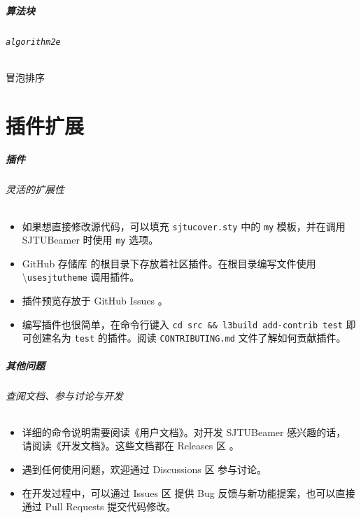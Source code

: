 \documentclass[
    aspectratio=169,  %
]{ctexbeamer}
\newcommand{\link}[1]{\href{#1}{\faLink}}
\begin{document}
\begin{frame}
  \frametitle{算法块}
  \framesubtitle{\texttt{algorithm2e}}

  \begin{algorithm}[H]
    \caption{冒泡排序}\label{alg:bubblesort}
    \BlankLine
    \;
  \end{algorithm}
\end{frame}

\part{插件扩展}

\begin{frame}[label=plugin]
  \frametitle{插件}
  \framesubtitle{灵活的扩展性}

  \begin{itemize}
    \item 如果想直接修改源代码，可以填充 \texttt{sjtucover.sty} 中的 \texttt{my}
          模板，并在调用 SJTUBeamer 时使用 \texttt{my} 选项。
    \item GitHub 存储库 \link{https://github.com/sjtug/SJTUBeamer} 的根目录下存放着社区插件。在根目录编写文件使用
          \textbackslash\texttt{usesjtutheme} 调用插件。
    \item 插件预览存放于 GitHub Issues
          \link{https://github.com/sjtug/SJTUBeamer/issues/81}。
    \item 编写插件也很简单，在命令行键入
          \texttt{cd src \&\& l3build add-contrib test}
          即可创建名为 \texttt{test} 的插件。阅读 \texttt{CONTRIBUTING.md}
          \link{https://github.com/sjtug/SJTUBeamer/blob/main/CONTRIBUTING.md}
          文件了解如何贡献插件。
  \end{itemize}
\end{frame}

\begin{frame}
  \frametitle{其他问题}
  \framesubtitle{查阅文档、参与讨论与开发}
  \begin{itemize}
    \item 详细的命令说明需要阅读《用户文档》。对开发 SJTUBeamer 感兴趣的话，
          请阅读《开发文档》。这些文档都在 Releases 区
          \link{https://github.com/sjtug/SJTUBeamer/releases}。
    \item 遇到任何使用问题，欢迎通过 Discussions 区
          \link{https://github.com/sjtug/SJTUBeamer/discussions}
          参与讨论。
    \item 在开发过程中，可以通过 Issues 区
          \link{https://github.com/sjtug/SJTUBeamer/issues}
          提供 Bug 反馈与新功能提案，也可以直接通过 Pull Requests
          \link{https://github.com/sjtug/SJTUBeamer/pulls}
          提交代码修改。
  \end{itemize}
\end{frame}
\end{document}
